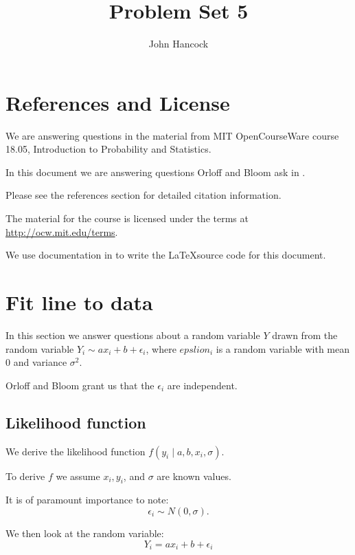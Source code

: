 \documentclass[a5paper,11pt]{article}
\author{John Hancock}
\title{Problem Set 5}
\begin{document}
\maketitle

\tableofcontents

\section{References and License}
We are answering questions in the material from MIT OpenCourseWare
course 18.05, Introduction to Probability and Statistics.

In this document we are answering questions Orloff and Bloom ask in
\cite{probSet5}.

Please see the references section for detailed citation information.

The material for the course is licensed under the terms at
\url{http://ocw.mit.edu/terms}.

We use documentation in to write the \LaTeX source code for this document.

\section{Fit line to data}

In this section we answer questions about a random variable $Y$ drawn from
the random variable $Y_i \sim ax_i + b + \epsilon_i$, where $epslion_i$ is
a random variable with mean $0$ and variance $\sigma^2$. 

Orloff and Bloom grant us that the $\epsilon_i$ are independent.

\subsection{Likelihood function}

We derive the likelihood function $f\left(y_i \mid a,b,x_i, \sigma\right)$.

To derive $f$ we assume $x_i, y_i$, and $\sigma$ are known values. 

It is of paramount importance to note:
\begin{equation}
\epsilon_i \sim N\left(0, \sigma \right).
\end{equation}

We then look at the random variable:
\begin{equation}
Y_i = ax_i + b + \epsilon_i
\end{equation}
\end{document}
